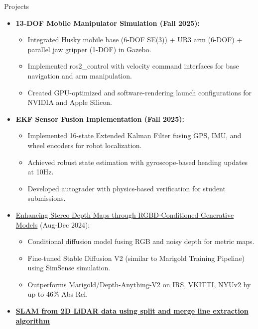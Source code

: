 \documentclass{resume} %
\begin{document}
\begin{rSection}{Projects}
    \begin{itemize}[noitemsep]

        \item {\bf 13-DOF Mobile Manipulator Simulation (Fall 2025):}
            \begin{itemize}
                \item Integrated Husky mobile base (6-DOF SE(3)) + UR3 arm (6-DOF) + parallel jaw gripper (1-DOF) in Gazebo.
                \item Implemented ros2\_control with velocity command interfaces for base navigation and arm manipulation.
                \item Created GPU-optimized and software-rendering launch configurations for NVIDIA and Apple Silicon.
            \end{itemize}

        \item {\bf EKF Sensor Fusion Implementation (Fall 2025):}
            \begin{itemize}
                \item Implemented 16-state Extended Kalman Filter fusing GPS, IMU, and wheel encoders for robot localization.
                \item Achieved robust state estimation with gyroscope-based heading updates at 10Hz.
                \item Developed autograder with physics-based verification for student submissions.
            \end{itemize}

        \item \href{https://hanlinmai.web.illinois.edu/assets/3D_vision_poster.pdf}{Enhancing Stereo Depth Maps through RGBD-Conditioned Generative Models} (Aug-Dec 2024):
            \begin{itemize}
                \item Conditional diffusion model fusing RGB and noisy depth for metric maps.
                \item Fine-tuned Stable Diffusion V2 (similar to Marigold Training Pipeline) using SimSense simulation.
                \item Outperforms Marigold/Depth-Anything-V2 on IRS, VKITTI, NYUv2 by up to 46\% Abs Rel.
            \end{itemize}
    
        \item {\bf \href{https://github.com/kulbir-ahluwalia/SLAM_using_2D_LiDAR_points}{SLAM from 2D LiDAR data using split and merge line extraction algorithm}} 
        

\end{itemize}
\end{rSection}
\end{document}
